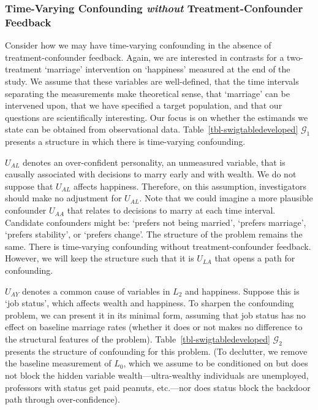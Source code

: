 \documentclass[
  single column]{article}
\begin{document}
\subsubsection{\texorpdfstring{Time-Varying Confounding \emph{without}
Treatment-Confounder
Feedback}{Time-Varying Confounding without Treatment-Confounder Feedback}}\label{time-varying-confounding-without-treatment-confounder-feedback}

Consider how we may have time-varying confounding in the absence of
treatment-confounder feedback. Again, we are interested in contrasts for
a two-treatment `marriage' intervention on `happiness' measured at the
end of the study. We assume that these variables are well-defined, that
the time intervals separating the measurements make theoretical sense,
that `marriage' can be intervened upon, that we have specified a target
population, and that our questions are scientifically interesting. Our
focus is on whether the estimands we state can be obtained from
observational data. Table~\ref{tbl-swigtabledeveloped} \(\mathcal{G}_1\)
presents a structure in which there is time-varying confounding.

\(U_{AL}\) denotes an over-confident personality, an unmeasured
variable, that is causally associated with decisions to marry early and
with wealth. We do not suppose that \(U_{AL}\) affects happiness.
Therefore, on this assumption, investigators should make no adjustment
for \(U_{AL}\). Note that we could imagine a more plausible confounder
\(U_{AA}\) that relates to decisions to marry at each time interval.
Candidate confounders might be: `prefers not being married', `prefers
marriage', `prefers stability', or `prefers change'. The structure of
the problem remains the same. There is time-varying confounding without
treatment-confounder feedback. However, we will keep the structure such
that it is \(U_{LA}\) that opens a path for confounding.

\(U_{AY}\) denotes a common cause of variables in \(L_2\) and happiness.
Suppose this is `job status', which affects wealth and happiness. To
sharpen the confounding problem, we can present it in its minimal form,
assuming that job status has no effect on baseline marriage rates
(whether it does or not makes no difference to the structural features
of the problem). Table~\ref{tbl-swigtabledeveloped} \(\mathcal{G}_2\)
presents the structure of confounding for this problem. (To declutter,
we remove the baseline measurement of \(L_0\), which we assume to be
conditioned on but does not block the hidden variable
wealth---ultra-wealthy individuals are unemployed, professors with
status get paid peanuts, etc.---nor does status block the backdoor path
through over-confidence).
\end{document}
